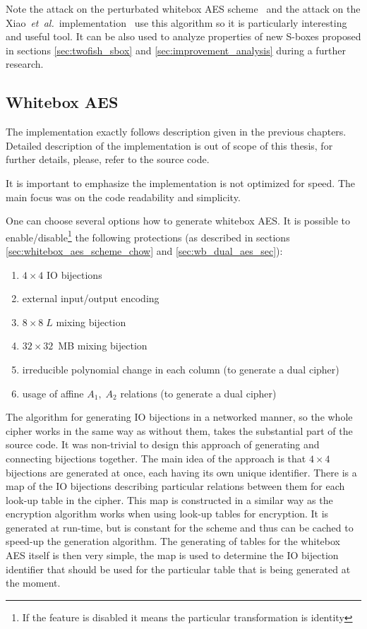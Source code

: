 \documentclass[11pt,oneside,final]{fithesis2}
\newcommand{\eal}{\emph{et~al.}}
\begin{document}
    Note the attack on the perturbated whitebox AES scheme~\citep{conf/indocrypt/MulderWP10} 
    and the attack on the Xiao~\eal\ implementation~\citep{conf/sacrypt/MulderRP12} use this algorithm so it is particularly interesting and useful tool. It can be also used to analyze properties
    of new S-boxes proposed in sections \ref{sec:twofish_sbox} and \ref{sec:improvement_analysis} during a further research.
    
    \subsection{Whitebox AES}
    The implementation exactly follows description given in the previous chapters. Detailed description of the implementation is out of scope of this thesis, 
    for further details, please, refer to the source code. 
    
    It is important to emphasize the implementation is not optimized for speed. The main focus was on the code readability and simplicity.
    
    One can choose several options how to generate whitebox AES. It is possible to 
    enable/disable\footnote{If the feature is disabled it means the particular transformation is identity} the following protections 
    (as described in sections \ref{sec:whitebox_aes_scheme_chow} and \ref{sec:wb_dual_aes_sec}):
    \begin{enumerate}
     \item $4\times4$ IO bijections
     \item external input/output encoding
     \item $8\times8 \; L$ mixing bijection
     \item $32\times32$~MB mixing bijection
     \item irreducible polynomial change in each column (to generate a dual cipher)
     \item usage of affine $A_1,\;A_2$ relations (to generate a dual cipher)
    \end{enumerate}
    
    The algorithm for generating IO bijections in a networked manner, so the whole cipher works
    in the same way as without them, takes the substantial part of the source code. It was non-trivial to design this approach 
    of generating and connecting bijections together. The main idea of the approach
    is that $4\times4$ bijections are generated at once, each having its own unique identifier. 
    There is a map of the IO bijections describing particular relations between them for each look-up table in the cipher. This map is constructed in a 
    similar way as the encryption algorithm works when using look-up tables for encryption. It is generated at run-time, but is constant for the scheme
    and thus can be cached to speed-up the generation algorithm. The generating of tables for the whitebox AES itself is then very simple, the map is used to determine 
    the IO bijection identifier that should be used for the particular table that is being generated at the moment.
    
\end{document}
